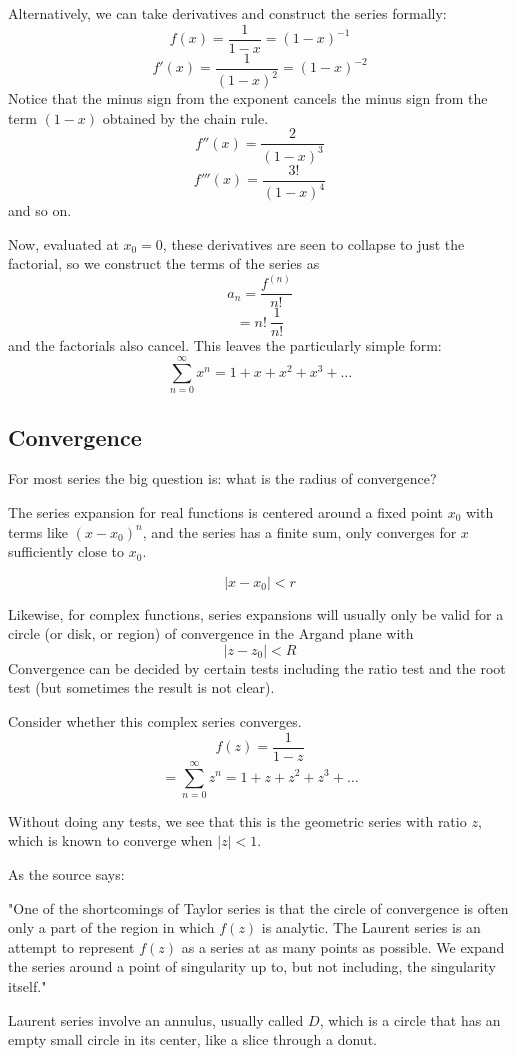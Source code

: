 \documentclass[11pt, oneside]{article}
\begin{document}
Alternatively, we can take derivatives and construct the series formally:
\[ f(x) = \frac{1}{1 - x} = (1-x)^{-1} \]
\[ f'(x) = \frac{1}{(1 - x)^2} = (1-x)^{-2} \]
Notice that the minus sign from the exponent cancels the minus sign from the term $(1-x)$ obtained by the chain rule.  
\[ f''(x) = \frac{2}{(1 - x)^3} \]
\[ f'''(x) = \frac{3!}{(1 - x)^4} \]
and so on.

Now, evaluated at $x_0 = 0$, these derivatives are seen to collapse to just the factorial, so we construct the terms of the series as
\[ a_n = \frac{f^{(n)}}{n!} \]
\[ = n! \ \frac{1}{n!} \]
and the factorials also cancel.  This leaves the particularly simple form:
\[ \sum_{n=0}^{\infty} x^n = 1 + x + x^2 + x^3 + \dots \]

\subsection*{Convergence}
For most series the big question is:  what is the radius of convergence?

The series expansion for real functions is centered around a fixed point $x_0$ with terms like $(x - x_0)^n$, and the series has a finite sum, only converges for $x$ sufficiently close to $x_0$.

\[ |x - x_0| < r \]

Likewise, for complex functions, series expansions will usually only be valid for a circle (or disk, or region) of convergence in the Argand plane with 
\[ | z - z_0 | < R \]
Convergence can be decided by certain tests including the ratio test and the root test (but sometimes the result is not clear).

Consider whether this complex series converges.  
\[ f(z) = \frac{1}{1 - z} \]
\[ =\sum_{n=0}^{\infty} z^n = 1 + z + z^2 + z^3 + \dots \]

Without doing any tests, we see that this is the geometric series with ratio $z$, which is known to converge when $|z| < 1$.

As the source says:  

"One of the shortcomings of Taylor series is that the circle of convergence is often only a part of the region in which $f(z)$ is analytic.  The Laurent series is an attempt to represent $f(z)$ as a series at as many points as possible. We expand the series around a point of singularity up to, but not including, the singularity itself."

Laurent series involve an annulus, usually called $D$, which is a circle that has an empty small circle in its center, like a slice through a donut.
\end{document}
